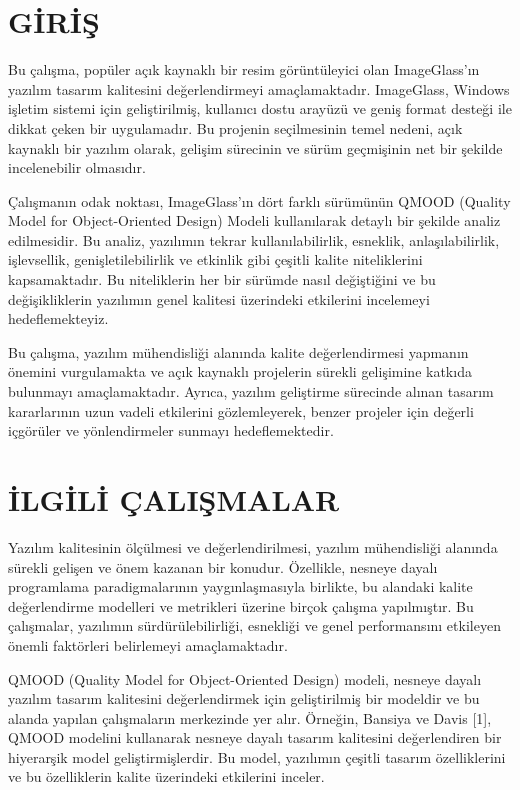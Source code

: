 \documentclass[conference]{IEEEtran}
\begin{document}
\IEEEpeerreviewmaketitle
\IEEEpubidadjcol

\section{GİRİŞ}

Bu çalışma, popüler açık kaynaklı bir resim görüntüleyici olan ImageGlass'ın yazılım tasarım kalitesini değerlendirmeyi amaçlamaktadır. ImageGlass, Windows işletim sistemi için geliştirilmiş, kullanıcı dostu arayüzü ve geniş format desteği ile dikkat çeken bir uygulamadır. Bu projenin seçilmesinin temel nedeni, açık kaynaklı bir yazılım olarak, gelişim sürecinin ve sürüm geçmişinin net bir şekilde incelenebilir olmasıdır.

Çalışmanın odak noktası, ImageGlass'ın dört farklı sürümünün QMOOD (Quality Model for Object-Oriented Design) Modeli kullanılarak detaylı bir şekilde analiz edilmesidir. Bu analiz, yazılımın tekrar kullanılabilirlik, esneklik, anlaşılabilirlik, işlevsellik, genişletilebilirlik ve etkinlik gibi çeşitli kalite niteliklerini kapsamaktadır. Bu niteliklerin her bir sürümde nasıl değiştiğini ve bu değişikliklerin yazılımın genel kalitesi üzerindeki etkilerini incelemeyi hedeflemekteyiz.

Bu çalışma, yazılım mühendisliği alanında kalite değerlendirmesi yapmanın önemini vurgulamakta ve açık kaynaklı projelerin sürekli gelişimine katkıda bulunmayı amaçlamaktadır. Ayrıca, yazılım geliştirme sürecinde alınan tasarım kararlarının uzun vadeli etkilerini gözlemleyerek, benzer projeler için değerli içgörüler ve yönlendirmeler sunmayı hedeflemektedir.

\section{İLGİLİ ÇALIŞMALAR}

Yazılım kalitesinin ölçülmesi ve değerlendirilmesi, yazılım mühendisliği alanında sürekli gelişen ve önem kazanan bir konudur. Özellikle, nesneye dayalı programlama paradigmalarının yaygınlaşmasıyla birlikte, bu alandaki kalite değerlendirme modelleri ve metrikleri üzerine birçok çalışma yapılmıştır. Bu çalışmalar, yazılımın sürdürülebilirliği, esnekliği ve genel performansını etkileyen önemli faktörleri belirlemeyi amaçlamaktadır.

QMOOD (Quality Model for Object-Oriented Design) modeli, nesneye dayalı yazılım tasarım kalitesini değerlendirmek için geliştirilmiş bir modeldir ve bu alanda yapılan çalışmaların merkezinde yer alır. Örneğin, Bansiya ve Davis [1], QMOOD modelini kullanarak nesneye dayalı tasarım kalitesini değerlendiren bir hiyerarşik model geliştirmişlerdir. Bu model, yazılımın çeşitli tasarım özelliklerini ve bu özelliklerin kalite üzerindeki etkilerini inceler.
\end{document}
